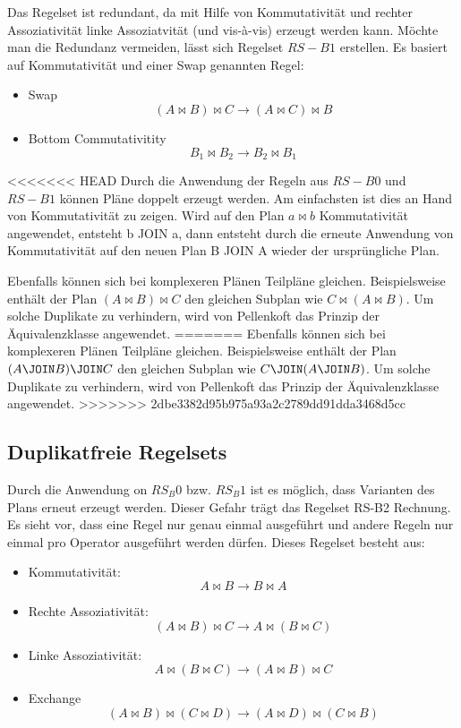 Das Regelset ist redundant, da mit Hilfe von Kommutativität und rechter Assoziativität linke Assoziatvität (und vis-à-vis) erzeugt werden kann. Möchte man die Redundanz vermeiden, lässt sich Regelset $RS-B1$ erstellen. Es basiert auf Kommutativität und einer Swap genannten Regel:

\begin{itemize}
\item Swap $$ (A \Join B) \Join C \to (A \Join C) \Join B $$
\item Bottom Commutativitity $$ B_1 \Join B_2 \to B_2 \Join B_1$$
\end{itemize}


<<<<<<< HEAD
Durch die Anwendung der Regeln aus $RS-B0$ und $RS-B1$ können Pläne doppelt erzeugt werden. Am einfachsten ist dies an Hand von Kommutativität zu zeigen. Wird auf den Plan $a \Join b$ Kommutativität angewendet, entsteht b JOIN a, dann entsteht durch  die erneute Anwendung von Kommutativität auf den neuen Plan B JOIN A wieder der ursprüngliche Plan.

Ebenfalls können sich bei komplexeren Plänen     Teilpläne gleichen. Beispielsweise enthält der Plan $(A \Join B) \Join C$ den gleichen Subplan wie $C \Join (A \Join B)$. Um solche Duplikate zu verhindern, wird von Pellenkoft das Prinzip der Äquivalenzklasse angewendet.
=======
Ebenfalls können sich bei komplexeren Plänen     Teilpläne gleichen. Beispielsweise enthält der Plan $(A \JOIN B) \JOIN C$ den gleichen Subplan wie $C \JOIN (A \JOIN B)$. Um solche Duplikate zu verhindern, wird von Pellenkoft das Prinzip der Äquivalenzklasse angewendet.
>>>>>>> 2dbe3382d95b975a93a2c2789dd91dda3468d5cc



\subsection{Duplikatfreie Regelsets}
Durch die Anwendung on $RS_B0$ bzw. $RS_B1$ ist es möglich, dass Varianten des Plans erneut erzeugt werden. Dieser Gefahr trägt das Regelset RS-B2 Rechnung. Es sieht vor, dass eine Regel nur genau einmal ausgeführt und andere Regeln nur einmal pro Operator ausgeführt werden dürfen. Dieses Regelset besteht aus:


\begin{itemize}
\item Kommutativität: $$ A \Join B \to B \Join A$$
\item Rechte Assoziativität: $$(A \Join B) \Join C \to A \Join (B \Join C) $$
\item Linke Assoziativität: $$A \Join (B \Join C) \to (A \Join B) \Join C$$

\item Exchange $$(A \Join B) \Join (C \Join D) \to (A \Join D) \Join (C \Join B) $$
\end{itemize}



